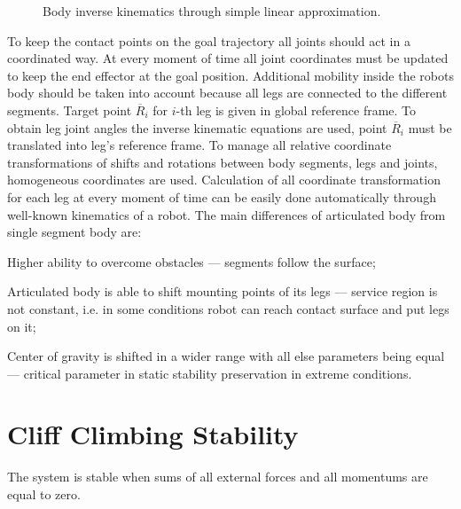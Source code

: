 \documentclass{ws-procs9x6}
\begin{document}
\begin{figure}
  \begin{center}
  \end{center}
  \caption{Body inverse kinematics through simple linear approximation.}
  \label{aba:spline}
\end{figure}

To keep the contact points on the goal trajectory all joints should act in a coordinated way. At every moment of time all joint coordinates must be updated to keep the end effector at the goal position. Additional mobility inside the robots body should be taken into account because all legs are connected to the different segments.  Target point $\overline{R}_i$ for $i$-th leg is given in global reference frame. To obtain leg joint angles the inverse kinematic equations are used, point $\overline{R}_i$ must be translated into leg’s reference frame. To manage all relative coordinate transformations of shifts and rotations between body segments, legs and joints, homogeneous coordinates are used. Calculation of all coordinate transformation for each leg at every moment of time can be easily done automatically through well-known kinematics of a robot.
The main differences of articulated body from single segment body are:
\begin{itemlist}
  \item Higher ability to overcome obstacles –-- segments follow the surface;
  \item Articulated body is able to shift mounting points of its legs –-- service region is not constant, i.e. in some conditions robot can reach contact surface and put legs on it;
  \item Center of gravity is shifted in a wider range with all else parameters being equal –-- critical parameter in static stability preservation in extreme conditions.
\end{itemlist}


\section{Cliff Climbing Stability}
The system is stable when sums of all external forces and all momentums are equal to zero. 
\end{document}

